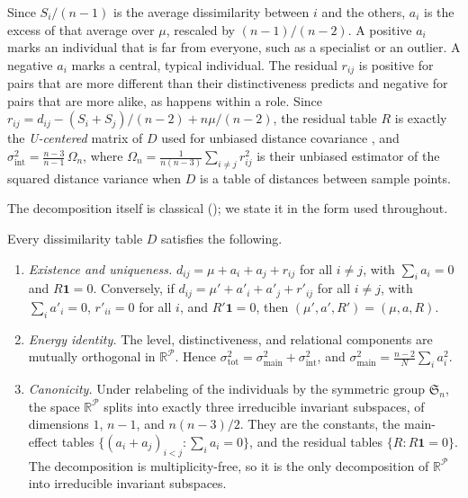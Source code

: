 \documentclass[twoside,11pt]{article}
\newcommand{\R}{\mathbb{R}}
\newcommand{\Pairs}{\mathcal{P}}
\newcommand{\sigmamain}{\sigma^2_{\mathrm{main}}}
\newcommand{\sigmaint}{\sigma^2_{\mathrm{int}}}
\newcommand{\sigmatot}{\sigma^2_{\mathrm{tot}}}
\newcommand{\one}{\mathbf{1}}
\newcommand{\Sym}{\mathfrak{S}}
\begin{document}
Since $S_i/(n-1)$ is the average dissimilarity between $i$ and the others,
$a_i$ is the excess of that average over $\mu$, rescaled by $(n-1)/(n-2)$. A positive $a_i$ marks an individual
that is far from everyone, such as a specialist or an outlier. A negative
$a_i$ marks a central, typical individual. The residual $r_{ij}$ is
positive for pairs that are more different than their distinctiveness
predicts and negative for pairs that are more alike, as happens within a
role. Since $r_{ij}=d_{ij}-(S_i+S_j)/(n-2)+n\mu/(n-2)$, the residual table
$R$ is exactly the \emph{U-centered} matrix of $D$ used for unbiased
distance covariance \citep{szekely2014partial}, and
$\sigmaint=\frac{n-3}{n-1}\,\Omega_n$, where
$\Omega_n=\frac{1}{n(n-3)}\sum_{i\neq j}r_{ij}^2$ is their unbiased
estimator of the squared distance variance when $D$ is a table of distances
between sample points.

The decomposition itself is classical (); we state it in
the form used throughout.

\begin{theorem}
\label{thm:anatomy}
Every dissimilarity table $D$ satisfies the following.
\begin{enumerate}
\item[(i)] \emph{Existence and uniqueness.} $d_{ij}=\mu+a_i+a_j+r_{ij}$
for all $i\ne j$, with $\sum_i a_i=0$ and $R\one=0$. Conversely, if
$d_{ij}=\mu'+a'_i+a'_j+r'_{ij}$ for all $i\neq j$, with $\sum_i a'_i=0$,
$r'_{ii}=0$ for all $i$, and $R'\one=0$, then $(\mu',a',R')=(\mu,a,R)$.
\item[(ii)] \emph{Energy identity.} The level, distinctiveness, and
relational components are mutually orthogonal in $\R^{\Pairs}$. Hence
$\sigmatot=\sigmamain+\sigmaint$, and
$\sigmamain=\frac{n-2}{N}\sum_{i}a_i^2$.
\item[(iii)] \emph{Canonicity.} Under relabeling of the individuals by
the symmetric group $\Sym_n$, the space $\R^{\Pairs}$ splits into exactly three
irreducible invariant subspaces, of dimensions $1$, $n-1$, and $n(n-3)/2$.
They are the constants, the main-effect tables
$\{(a_i+a_j)_{i<j}:\sum_i a_i=0\}$, and the residual tables
$\{R:R\one=0\}$. The decomposition is multiplicity-free, so it is the only
decomposition of $\R^{\Pairs}$ into irreducible invariant subspaces.
\end{enumerate}
\end{theorem}
\end{document}
